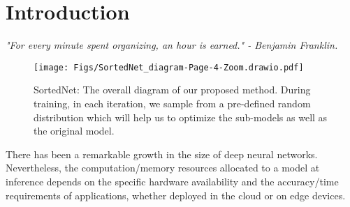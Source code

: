 \documentclass[letterpaper]{article} %
\begin{document}
\begin{abstract}
\end{abstract}

\section{Introduction}

\textit{"For every minute spent organizing, an hour is earned." - Benjamin Franklin.}

\begin{figure*}[htb!]
    \centering
    \texttt{[image: Figs/SortedNet\_diagram-Page-4-Zoom.drawio.pdf]}
    \caption{SortedNet: The overall diagram of our proposed method. During training, in each iteration, we sample from a pre-defined random distribution which will help us to optimize the sub-models as well as the original model.}
    \label{fig:DyLoRA}
\end{figure*}


There has been a remarkable growth in the size of deep neural networks. %
Nevertheless, the computation/memory resources allocated to a model at inference depends on the specific hardware availability and the accuracy/time requirements of applications, whether deployed in the cloud or on edge devices.
\end{document}
